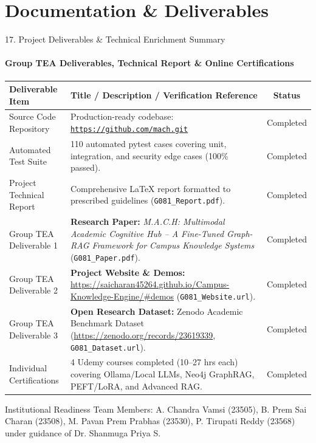 \documentclass[aspectratio=169, 11pt]{beamer}
\begin{document}
\section{Documentation \& Deliverables}

\begin{frame}{17. Project Deliverables \& Technical Enrichment Summary}
    \framesubtitle{Group TEA Deliverables, Technical Report \& Online Certifications}
    \begin{table}
        \centering
        \scriptsize
        \renewcommand{\arraystretch}{1.10}
        \begin{tabular}{p{3.2cm} p{7.6cm} c}
            \toprule
            \textbf{Deliverable Item} & \textbf{Title / Description / Verification Reference} & \textbf{Status} \\
            \midrule
            Source Code Repository & Production-ready codebase: \href{https://github.com/saicharan45264/Campus-Knowledge-Engine.git}{\texttt{https://github.com/mach.git}} & Completed \\
            Automated Test Suite & 110 automated pytest cases covering unit, integration, and security edge cases (100\% passed). & Completed \\
            Project Technical Report & Comprehensive LaTeX report formatted to prescribed guidelines (\texttt{G081\_Report.pdf}). & Completed \\
            Group TEA Deliverable 1 & \textbf{Research Paper:} \textit{M.A.C.H: Multimodal Academic Cognitive Hub -- A Fine-Tuned Graph-RAG Framework for Campus Knowledge Systems} (\texttt{G081\_Paper.pdf}). & Completed \\
            Group TEA Deliverable 2 & \textbf{Project Website \& Demos:} \url{https://saicharan45264.github.io/Campus-Knowledge-Engine/#demos} (\texttt{G081\_Website.url}). & Completed \\
            Group TEA Deliverable 3 & \textbf{Open Research Dataset:} Zenodo Academic Benchmark Dataset (\url{https://zenodo.org/records/23619339}, \texttt{G081\_Dataset.url}). & Completed \\
            Individual Certifications & 4 Udemy courses completed (10--27 hrs each) covering Ollama/Local LLMs, Neo4j GraphRAG, PEFT/LoRA, and Advanced RAG. & Completed \\
            \bottomrule
        \end{tabular}
    \end{table}

    \begin{block}{Institutional Readiness}
        \tiny
        Team Members: A. Chandra Vamsi (23505), B. Prem Sai Charan (23508), M. Pavan Prem Prabhas (23530), P. Tirupati Reddy (23568) under guidance of Dr. Shanmuga Priya S.
    \end{block}
\end{frame}
\end{document}
